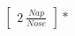 \documentclass[preview]{standalone}
\begin{document}
\begin{align*}
\begin{bmatrix} 2 \ \frac{Nap}{Nose} \end{bmatrix} *
\end{align*}
\end{document}
